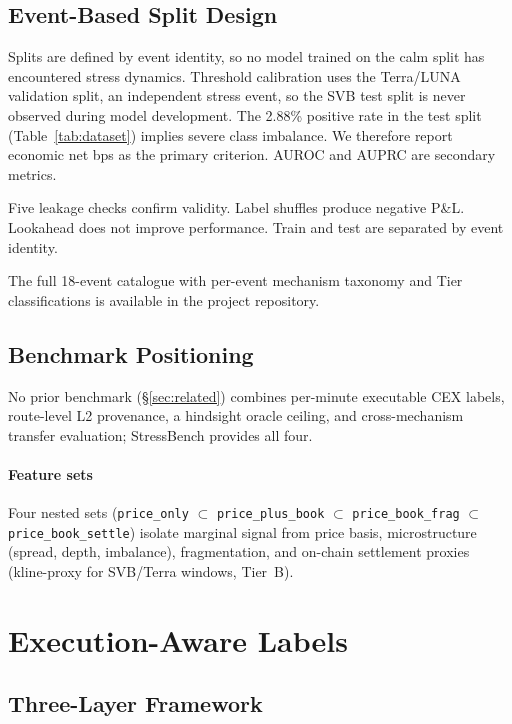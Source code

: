 \documentclass[sigconf,anonymous,natbib=false]{acmart}
\begin{document}
\subsection{Event-Based Split Design}
\label{sec:splits}

Splits are defined by event identity, so no model trained on the calm
split has encountered stress dynamics.
Threshold calibration uses the Terra/LUNA validation split, an
independent stress event, so the SVB test split is never observed
during model development.
The 2.88\% positive rate in the test split (Table~\ref{tab:dataset}) implies severe class imbalance.
We therefore report economic net bps as the primary criterion. AUROC
and AUPRC are secondary metrics.

Five leakage checks confirm validity. Label shuffles produce negative P\&L.
Lookahead does not improve performance. Train and test are separated by event identity.

The full 18-event catalogue with per-event mechanism taxonomy and Tier
classifications is available in the project repository.

\subsection{Benchmark Positioning}
\label{sec:positioning}
No prior benchmark (\S\ref{sec:related}) combines per-minute executable CEX
labels, route-level L2 provenance, a hindsight oracle ceiling, and
cross-mechanism transfer evaluation; StressBench provides all four.

\paragraph{Feature sets} Four nested sets (\texttt{price\_only} $\subset$
\texttt{price\_plus\_book} $\subset$ \texttt{price\_book\_frag} $\subset$
\texttt{price\_book\_settle}) isolate marginal signal from price basis,
microstructure (spread, depth, imbalance), fragmentation, and on-chain settlement
proxies (kline-proxy for SVB/Terra windows, Tier~B).


\section{Execution-Aware Labels}
\label{sec:labels}

\subsection{Three-Layer Framework}
\label{sec:framework}
\end{document}

